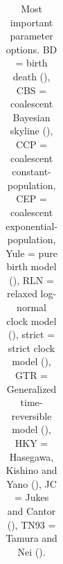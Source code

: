 \begin{table}
\begin{tabular}{|p{3.4cm}|p{9.7cm}|p{4.5cm}@{}|}
    \hline
  \end{tabular}
  \caption{
    Most important parameter options.
    BD = birth death (\cite{nee1994reconstructed}), 
    CBS = coalescent Bayesian skyline (\cite{drummond2005bayesian}), 
    CCP = coalescent constant-population, 
    CEP = coalescent exponential-population,
    Yule = pure birth model (\cite{yule}),
    RLN = relaxed log-normal clock model (\cite{drummond2006relaxed}),
    strict = strict clock model (\cite{zuckerkandl1965molecules}), 
    GTR = Generalized time-reversible model (\cite{tavare1986some}), 
    HKY = Hasegawa, Kishino and Yano (\cite{hasegawa1985dating}), 
    JC = Jukes and Cantor (\cite{jukes1969evolution}), 
    TN93 = Tamura and Nei (\cite{tamura1993estimation}).
  }
  \label{tab:options}
\bigskip


\end{table}
